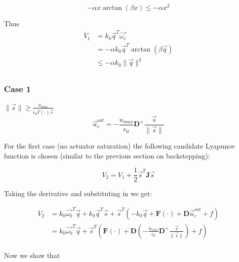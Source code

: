 \begin{equation}
    -\alpha x \arctan(\beta x) \leq -\alpha x^2
\end{equation}

Thus
\begin{equation}
    \begin{split}
        \dot{V_{1}}&=k_{0}\vec{q}^T\vec{\omega_c} \\
        &= -\alpha k_{0}\vec{q}^T \arctan(\beta \vec{q}) \\
        &\leq -\alpha k_{0} \lVert\vec{q}\rVert^{2}
    \end{split}
\end{equation}

\subsection{} \label{apx:B}
\subsubsection{Case 1} $\lVert \vec{s} \rVert \geq \frac{u_{max}}{\epsilon_0\Gamma(\cdot)\vec{s}}$
\begin{equation}
\vec{u}_c^{sat} = -\frac{u_{max}}{\epsilon_0}\mathbf{D}^+ \frac{\vec{s}}{\lVert \vec{s} \rVert}
\end{equation}

For the first case (no actuator saturation) the following candidate Lyapunov function is chosen (similar to the previous section on backstepping):

\begin{equation}
    V_2=V_1 + \frac{1}{2}\vec{s}^T\mathbf{J}\vec{s}
\end{equation}

Taking the derivative and substituting in we get:

\begin{equation}
    \begin{split}
        \dot{V_2} &= k_0\vec{\omega_b}^T\vec{q} + k_0\vec{q}^T\vec{s} + \vec{s}^T(-k_0\vec{q} + \mathbf{F}(\cdot) + \mathbf{D}\vec{u}_c^{sat} + f) \\
        &=  k_0\vec{\omega_b}^T\vec{q} + \vec{s}^T(\mathbf{F}(\cdot) + \mathbf{D}(-\frac{u_{max}}{\epsilon_0}\mathbf{D}^+ \frac{\vec{s}}{\lVert \vec{s} \rVert}) + f) \\
    \end{split}
\end{equation}

Now we show that

